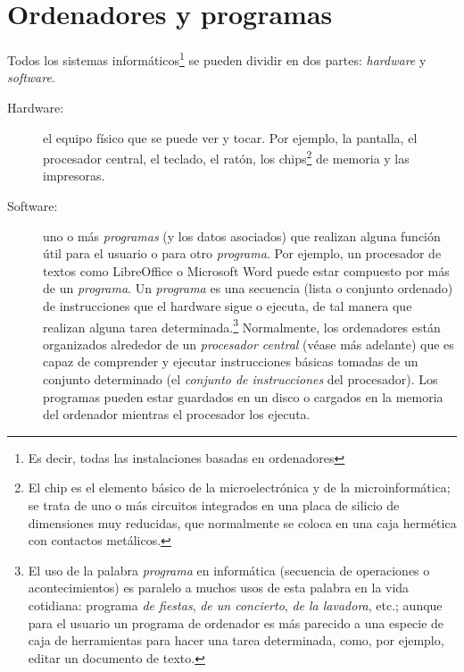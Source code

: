 \chapter{Ordenadores y programas} 

 \label{se:OiP} 

Todos los sistemas informáticos\footnote{Es decir, todas las instalaciones basadas en ordenadores} se pueden dividir en dos partes: \emph{hardware} y \emph{software}. 

\begin{description} \item[Hardware:] el equipo físico que se puede ver y tocar. Por ejemplo, la pantalla, el procesador central, el teclado, el ratón, los chips\footnote{El chip es el elemento básico de la microelectrónica y de la microinformática; se trata de uno o más circuitos integrados en una placa de silicio de dimensiones muy reducidas, que normalmente se coloca en una caja hermética con contactos metálicos.} de memoria y las impresoras. 

\item[Software:] uno o más \emph{programas} (y los datos asociados) que realizan alguna función útil para el usuario o para otro \emph{programa}. Por ejemplo, un procesador de textos como LibreOffice o Microsoft Word puede estar compuesto por más de un \emph{programa}. Un \emph{programa} es una secuencia (lista o conjunto ordenado) de instrucciones que el hardware sigue o ejecuta, de tal manera que realizan alguna tarea determinada.\footnote{El uso de la palabra \emph{programa} en informática (secuencia de operaciones o acontecimientos) es paralelo a muchos usos de esta palabra en la vida cotidiana: programa \emph{de fiestas}, \emph{de un concierto}, \emph{de la lavadora}, etc.; aunque para el usuario un programa de ordenador es más parecido a una especie de caja de herramientas para hacer una tarea determinada, como, por ejemplo, editar un documento de texto.} Normalmente, los ordenadores están organizados alrededor de un \emph{procesador central} (véase más adelante) que es capaz de comprender y ejecutar instrucciones básicas tomadas de un conjunto determinado (el \emph{conjunto de instrucciones} del procesador). Los programas pueden estar guardados en un disco o cargados en la memoria del ordenador mientras el procesador los ejecuta. \end{description} 

